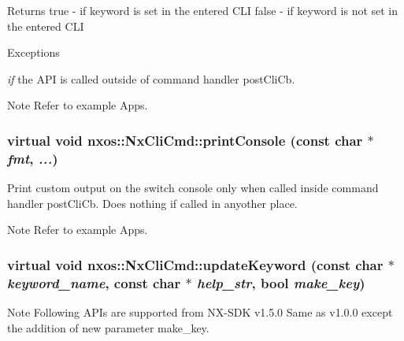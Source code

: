 \begin{DoxyReturn}{Returns}
true -\/ if keyword is set in the entered CLI false -\/ if keyword is not set in the entered CLI
\end{DoxyReturn}

\begin{DoxyExceptions}{Exceptions}
\item[{\em if}]the API is called outside of command handler postCliCb. \end{DoxyExceptions}
\begin{DoxyNote}{Note}
Refer to example Apps. 
\end{DoxyNote}
\hypertarget{classnxos_1_1NxCliCmd_a10c723c79d75ac2c85821b5ca6540c62}{
\subsubsection[{printConsole}]{\setlength{\rightskip}{0pt plus 5cm}virtual void nxos::NxCliCmd::printConsole (const char $\ast$ {\em fmt}, \/   {\em ...})}}
\label{classnxos_1_1NxCliCmd_a10c723c79d75ac2c85821b5ca6540c62}
Print custom output on the switch console only when called inside command handler postCliCb. Does nothing if called in anyother place.

\begin{DoxyNote}{Note}
Refer to example Apps. 
\end{DoxyNote}
\hypertarget{classnxos_1_1NxCliCmd_ae1669d9fbeaa164494a503379ca52b86}{
\subsubsection[{updateKeyword}]{\setlength{\rightskip}{0pt plus 5cm}virtual void nxos::NxCliCmd::updateKeyword (const char $\ast$ {\em keyword\_\-name}, \/  const char $\ast$ {\em help\_\-str}, \/  bool {\em make\_\-key})}}
\label{classnxos_1_1NxCliCmd_ae1669d9fbeaa164494a503379ca52b86}
\begin{DoxyNote}{Note}
Following APIs are supported from NX-\/SDK v1.5.0 Same as v1.0.0 except the addition of new parameter make\_\-key.
\end{DoxyNote}


